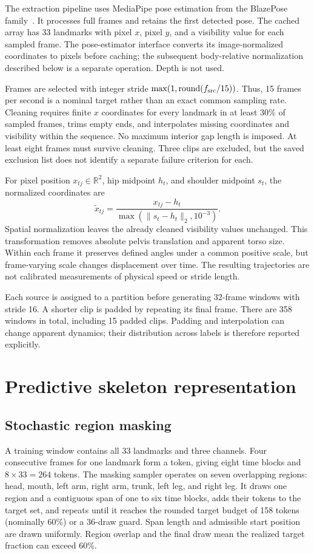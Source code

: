 \documentclass[10pt,twocolumn,letterpaper]{article}
\begin{document}
The extraction pipeline uses MediaPipe pose estimation from the BlazePose family~\cite{blazepose}. It processes full frames and retains the first detected pose. The cached array has 33 landmarks with pixel $x$, pixel $y$, and a visibility value for each sampled frame. The pose-estimator interface converts its image-normalized coordinates to pixels before caching; the subsequent body-relative normalization described below is a separate operation. Depth is not used.

Frames are selected with integer stride $\max(1,\operatorname{round}(f_{\rm src}/15))$. Thus, 15 frames per second is a nominal target rather than an exact common sampling rate. Cleaning requires finite $x$ coordinates for every landmark in at least 30\% of sampled frames, trims empty ends, and interpolates missing coordinates and visibility within the sequence. No maximum interior gap length is imposed. At least eight frames must survive cleaning. Three clips are excluded, but the saved exclusion list does not identify a separate failure criterion for each.

For pixel position $x_{tj}\in\mathbb{R}^2$, hip midpoint $h_t$, and shoulder midpoint $s_t$, the normalized coordinates are
\begin{equation}
\widetilde{x}_{tj}=\frac{x_{tj}-h_t}{\max(\|s_t-h_t\|_2,10^{-3})}.
\label{eq:normalization}
\end{equation}
Spatial normalization leaves the already cleaned visibility values unchanged. This transformation removes absolute pelvis translation and apparent torso size. Within each frame it preserves defined angles under a common positive scale, but frame-varying scale changes displacement over time. The resulting trajectories are not calibrated measurements of physical speed or stride length.

Each source is assigned to a partition before generating 32-frame windows with stride 16. A shorter clip is padded by repeating its final frame. There are 358 windows in total, including 15 padded clips. Padding and interpolation can change apparent dynamics; their distribution across labels is therefore reported explicitly.

\section{Predictive skeleton representation}
\subsection{Stochastic region masking}
A training window contains all 33 landmarks and three channels. Four consecutive frames for one landmark form a token, giving eight time blocks and $8\times33=264$ tokens. The masking sampler operates on seven overlapping regions: head, mouth, left arm, right arm, trunk, left leg, and right leg. It draws one region and a contiguous span of one to six time blocks, adds their tokens to the target set, and repeats until it reaches the rounded target budget of 158 tokens (nominally 60\%) or a 36-draw guard. Span length and admissible start position are drawn uniformly. Region overlap and the final draw mean the realized target fraction can exceed 60\%.
\end{document}
